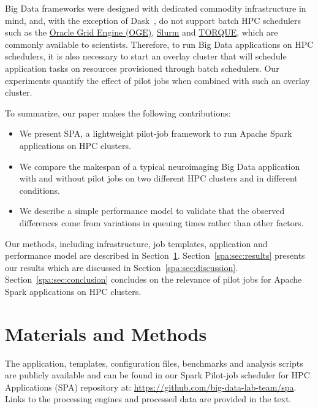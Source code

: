     
    Big Data frameworks were designed with dedicated commodity infrastructure in
    mind, and, with the exception of Dask~\cite{rocklin2015dask}, do not support
    batch HPC schedulers such as the
    \href{http://www.univa.com/products/}{Oracle Grid Engine (OGE)},
    \href{https://slurm.schedmd.com/}{Slurm} and
    \href{https://www.adaptivecomputing.com/products/torque/}{TORQUE}, which are
    commonly available to scientists. Therefore, to run Big Data applications on
    HPC schedulers, it is also necessary to start an overlay cluster that will
    schedule application tasks on resources provisioned through batch
    schedulers. Our experiments quantify the effect of pilot jobs when combined
    with such an overlay cluster.
    
    To summarize, our paper makes the following contributions:
    \begin{itemize}
    \item We present SPA, a lightweight pilot-job framework to run Apache Spark
    applications on HPC clusters.
    \item We compare the makespan of a typical neuroimaging Big Data application
    with and without pilot jobs on two different HPC clusters and in different
    conditions.
    \item We describe a simple performance model to validate that the observed
    differences come from variations in queuing times rather than other factors.
    \end{itemize}
    Our methods, including infrastructure, job templates, application and
    performance model are described in Section~\ref{spa:sec:methods}.
    Section~\ref{spa:sec:results} presents our results which are discussed in
    Section~\ref{spa:sec:discussion}. Section~\ref{spa:sec:conclusion} concludes on
    the relevance of pilot jobs for Apache Spark applications on HPC clusters.
    
    \section{Materials and Methods}\label{spa:sec:methods}
    
	The application, templates, configuration files, benchmarks and analysis
	scripts are publicly available and can be found in our Spark Pilot-job
	scheduler for HPC Applications (SPA) repository at:
	\href{https://github.com/big-data-lab-team/spa}{https://github.com/big-data-lab-team/spa}.
	Links to the processing engines and processed data are provided in the
	text.
	
